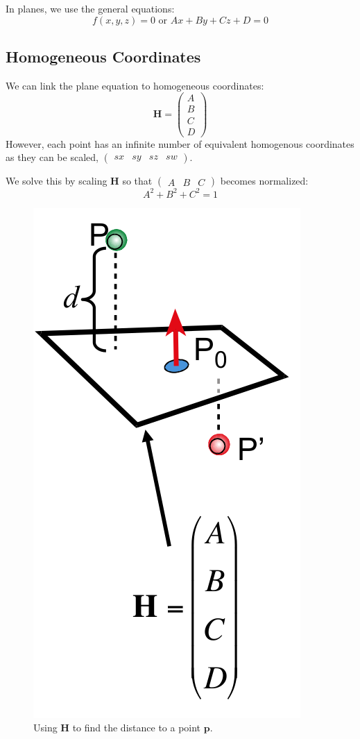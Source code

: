 \documentclass[11pt]{article}
\begin{document}
In planes, we use the general equations:
\[
  f(x, y, z) = 0 \text{ or } Ax + By + Cz + D = 0
\]

\subsection{Homogeneous Coordinates}
We can link the plane equation to homogeneous coordinates:
\[
  \textbf{H} = \begin{pmatrix} A \\ B \\ C \\ D \end{pmatrix}  
\]
However, each point has an infinite number of equivalent homogenous coordinates as they can be scaled, $\begin{pmatrix} sx & sy & sz & sw \end{pmatrix}$.

We solve this by scaling $\textbf{H}$ so that $\begin{pmatrix} A & B & C \end{pmatrix}$ becomes normalized:
\[
  A^2 + B^2 + C^2 = 1  
\]

\begin{figure}[htb!]
  \caption{Using $\textbf{H}$ to find the distance to a point $\textbf{p}$.}
  \includegraphics[scale=0.3]{signeddistance}
  \centering
\end{figure}
\end{document}
